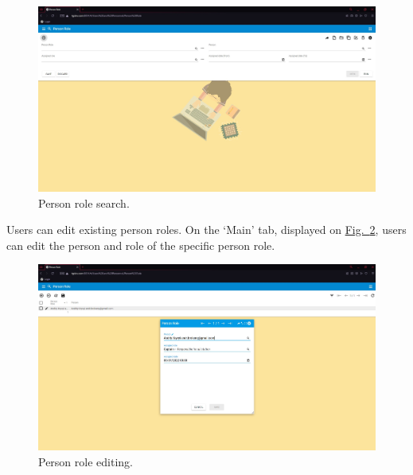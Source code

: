 \begin{figure}[!htbp]
\centering
\includegraphics[width=0.95\linewidth]{sections/personnel/images/fig6.jpg}
\caption{Person role search.}\label{sections/personnel/images/fig6}
\end{figure}

\newpage
Users can edit existing person roles. On the ‘Main’ tab, displayed on \hyperref[sections/personnel/images/fig10]{Fig.~\ref*{sections/personnel/images/fig10}}, users can edit the person and role of the specific person role.

\begin{figure}[!htbp]
\centering
\includegraphics[width=0.95\linewidth]{sections/personnel/images/fig10.jpg}
\caption{Person role editing.}\label{sections/personnel/images/fig10}
\end{figure}
